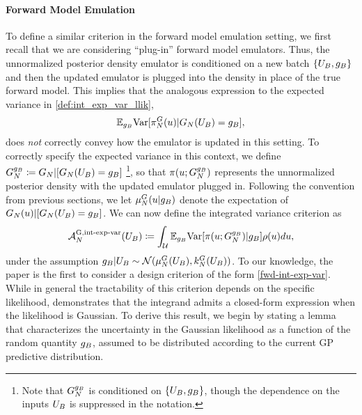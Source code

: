 \documentclass[12pt]{article}
\begin{document}
\paragraph{Forward Model Emulation}
To define a similar criterion in the forward model emulation setting, we first recall that we are considering ``plug-in'' forward model emulators. 
Thus, the unnormalized posterior density emulator is conditioned on a new batch $\{\designBatchIn, \designBatchFwd\}$ and then 
the updated emulator is plugged into the density in place of the true forward model. This implies that the analogous expression to 
the expected variance in \ref{def:int_exp_var_llik}, 
\begin{align*}
\E_{\designBatchFwd} \Var[\fwdEmRdm[\Ndesign]{\postDens}(\Par) | \fwdEm[\Ndesign](\designBatchIn) = \designBatchFwd],
\end{align*}
does \textit{not} correctly convey how the emulator is updated in this setting. To correctly specify the expected variance in this 
context, we define $\fwdEmCond{\designBatchFwd} \Def \fwdEm | [\fwdEm(\designBatchIn) = \designBatchFwd]$
\footnote{Note that $\fwdEmCond{\designBatchFwd}$ is conditioned on $\{\designBatchIn, \designBatchFwd\}$, though the 
dependence on the inputs $\designBatchIn$ is suppressed in the notation.}, so that 
$\postDens(\Par; \fwdEmCond{\designBatchFwd})$ represents the unnormalized posterior density 
with the updated emulator plugged in. Following the convention from previous sections, we let 
$\emMean[\Ndesign]{\fwd}(\Par | \designBatchFwd)$ denote the expectation of 
$\fwdEm(\Par) | [\fwdEm(\designBatchIn) = \designBatchFwd]$.
We can now define the integrated variance criterion as 
\begin{align}
\labelAcq[\Ndesign]{\fwdintExpVarLabel}(\designBatchIn) \Def
\int_{\parSpace} \E_{\designBatchFwd} \Var[\postDens(\Par; \fwdEmCond{\designBatchFwd}) | \designBatchFwd]\weightDens(\Par) d\Par, \label{fwd-int-exp-var}
\end{align}
under the assumption $\designBatchFwd|\designBatchIn \sim \Gaussian(\emMean{\fwd}(\designBatchIn), \emKer{\fwd}(\designBatchIn))$.
To our knowledge, 
the paper \cite{SinsbeckNowak} is the first to consider a design criterion of the form \ref{fwd-int-exp-var}. 
While in general the tractability of this criterion depends on the specific likelihood, \cite{Surer2023sequential} 
demonstrates that the integrand admits a closed-form expression when the likelihood is Gaussian. 
To derive this result, we begin by stating a lemma that characterizes the uncertainty in the Gaussian 
likelihood as a function of the random quantity $\designBatchFwd$, assumed to be distributed according 
to the current GP predictive distribution. 
\end{document}
